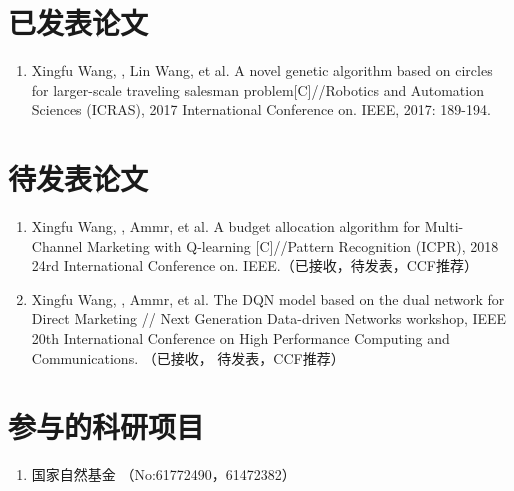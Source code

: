 ﻿\begin{publications}

\section*{已发表论文}

\begin{enumerate}
\item  Xingfu Wang, , Lin Wang, et al. A novel genetic algorithm based on circles for larger-scale traveling salesman problem[C]//Robotics and Automation Sciences (ICRAS), 2017 International Conference on. IEEE, 2017: 189-194.
\end{enumerate}

\section*{待发表论文}

\begin{enumerate}
\item Xingfu Wang, , Ammr, et al. A budget allocation algorithm for Multi-Channel Marketing with Q-learning [C]//Pattern Recognition (ICPR), 2018 24rd International Conference on. IEEE.（已接收，待发表，CCF推荐）

\item Xingfu Wang, , Ammr, et al. The DQN model based on the dual network for Direct Marketing // Next Generation Data-driven Networks workshop, IEEE 20th International Conference on High Performance Computing and Communications. （已接收， 待发表，CCF推荐）



\end{enumerate}

\section*{参与的科研项目}
\begin{enumerate}
\item 国家自然基金 （No:61772490，61472382）

\end{enumerate}

\end{publications}
